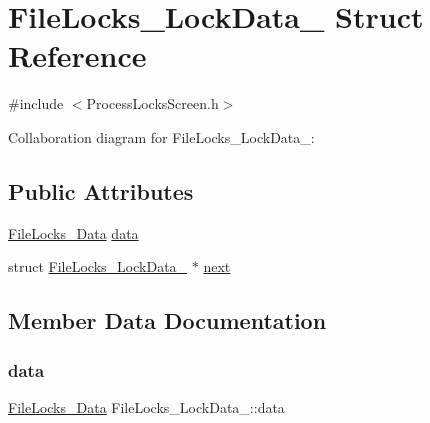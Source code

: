 \hypertarget{structFileLocks__LockData__}{}\section{File\+Locks\+\_\+\+Lock\+Data\+\_\+ Struct Reference}
\label{structFileLocks__LockData__}


{\ttfamily \#include $<$Process\+Locks\+Screen.\+h$>$}



Collaboration diagram for File\+Locks\+\_\+\+Lock\+Data\+\_\+\+:
\subsection*{Public Attributes}
\begin{DoxyCompactItemize}
\item 
\hyperlink{ProcessLocksScreen_8h_a0a2b6b11a615dd22aae5ae332db5445e}{File\+Locks\+\_\+\+Data} \hyperlink{structFileLocks__LockData___a0761c7455cf0279d57dfd085650124cc}{data}
\item 
struct \hyperlink{structFileLocks__LockData__}{File\+Locks\+\_\+\+Lock\+Data\+\_\+} $\ast$ \hyperlink{structFileLocks__LockData___a8cc0972f2878d199cba343f0ec4fba88}{next}
\end{DoxyCompactItemize}


\subsection{Member Data Documentation}
\mbox{\label{structFileLocks__LockData___a0761c7455cf0279d57dfd085650124cc}} 
\subsubsection{\texorpdfstring{data}{data}}
{\footnotesize\ttfamily \hyperlink{ProcessLocksScreen_8h_a0a2b6b11a615dd22aae5ae332db5445e}{File\+Locks\+\_\+\+Data} File\+Locks\+\_\+\+Lock\+Data\+\_\+\+::data}

\mbox{\label{structFileLocks__LockData___a8cc0972f2878d199cba343f0ec4fba88}} 

